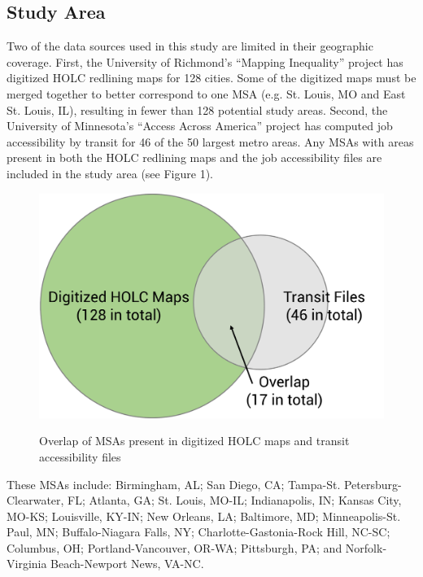 \documentclass[paper=letter, fontsize=12pt]{scrartcl} %
\begin{document}
\subsection{Study Area}
Two of the data sources used in this study are limited in their geographic coverage. First, the University of Richmond's ``Mapping Inequality'' project has digitized HOLC redlining maps for 128 cities. Some of the digitized maps must be merged together to better correspond to one MSA (e.g. St. Louis, MO and East St. Louis, IL), resulting in fewer than 128 potential study areas. Second, the University of Minnesota's ``Access Across America'' project has computed job accessibility by transit for 46 of the 50 largest metro areas. Any MSAs with areas present in both the HOLC redlining maps and the job accessibility files are included in the study area (see Figure 1).\par
\begin{figure}[h]
	\centering
	\includegraphics[width = 4.5in]{StudyAreaSelection}\\
	\caption{Overlap of MSAs present in digitized HOLC maps and transit accessibility files}
\end{figure}
These MSAs include: Birmingham, AL; San Diego, CA; Tampa-St. Petersburg-Clearwater, FL; Atlanta, GA; St. Louis, MO-IL; Indianapolis, IN; Kansas City, MO-KS; Louisville, KY-IN; New Orleans, LA; Baltimore, MD; Minneapolis-St. Paul, MN; Buffalo-Niagara Falls, NY; Charlotte-Gastonia-Rock Hill, NC-SC; Columbus, OH; Portland-Vancouver, OR-WA; Pittsburgh, PA; and Norfolk-Virginia Beach-Newport News, VA-NC.
\end{document}
